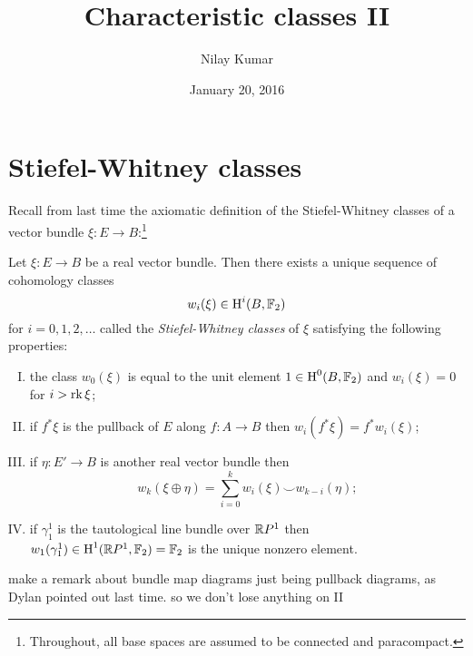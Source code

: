 \documentclass{amsart}
\title{Characteristic classes II}
\author{Nilay Kumar}
\date{January 20, 2016}
\begin{document}
\maketitle

\section{Stiefel-Whitney classes}

Recall from last time the axiomatic definition of the Stiefel-Whitney classes of a vector bundle
$\xi:E\to B$:\footnote{Throughout, all base spaces are assumed to be connected and paracompact.}
\begin{theorem}
    Let $\xi:E\to B$ be a real vector bundle. Then there exists a unique sequence of cohomology classes
    \begin{equation*}
        w_i(\xi) \in \operatorname{H}^i(B, \mathbb{F}_2)
    \end{equation*}
    for $i=0,1,2,\ldots$ called the \textit{Stiefel-Whitney classes} of $\xi$ satisfying the following
    properties:
    \begin{enumerate}[(I)]
        \item the class $w_0(\xi)$ is equal to the unit element $1\in\operatorname{H}^0(B,\mathbb{F}_2)$ and $w_i(\xi)=0$ for $i>\operatorname{rk}\xi$;
        \item if $f^*\xi$ is the pullback of $E$ along $f:A\to B$ then $w_i(f^*\xi)=f^*w_i(\xi)$;
        \item if $\eta:E'\to B$ is another real vector bundle then
            \begin{equation*}
                w_k(\xi\oplus \eta) = \sum_{i=0}^k w_i(\xi)\smile w_{k-i}(\eta);
            \end{equation*}
        \item if $\gamma_1^1$ is the tautological line bundle over $\mathbb{R} P^1$ then $w_1(\gamma_1^1)\in\operatorname{H}^1(\mathbb{R} P^1,\mathbb{F}_2)=\mathbb{F}_2$
            is the unique nonzero element.
    \end{enumerate}
    \label{sw}
\end{theorem}

{\color{magenta} make a remark about bundle map diagrams just being pullback diagrams, as Dylan pointed out
last time. so we don't lose anything on II}
\end{document}
